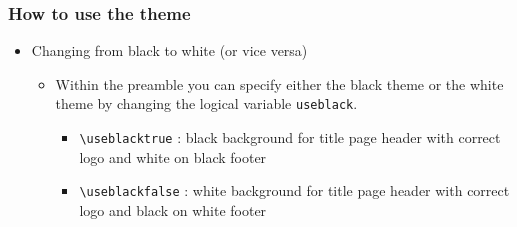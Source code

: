 \begin{frame}[t,fragile]
    \frametitle{How to use the theme}
    \begin{itemize}
        \item Changing from black to white (or vice versa)
            \begin{itemize}
                \item Within the preamble you can specify either the black theme or the white
                    theme by changing the logical variable \verb!useblack!.
                    \begin{itemize}
                        \item \verb!\useblacktrue! : black background for title page header with correct logo and white on black footer
                        \item \verb!\useblackfalse! : white background for title page header with correct logo and black on white footer
                    \end{itemize}
            \end{itemize}
    \end{itemize}
\end{frame}

